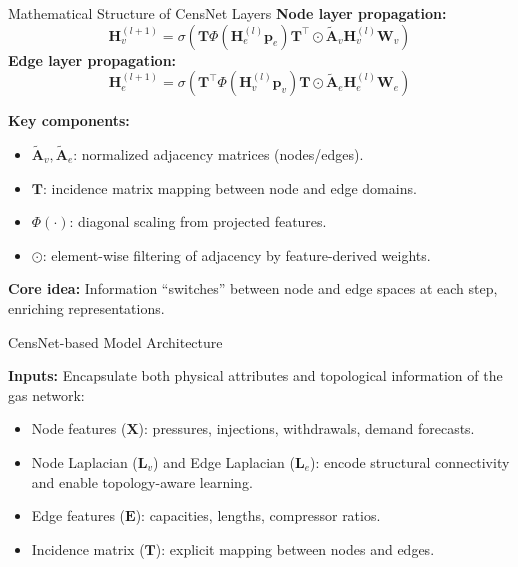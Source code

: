 \documentclass[hyperref={colorlinks,citecolor=blue,linkcolor=blue,urlcolor=blue}]{beamer}
\begin{document}
\begin{frame}{Mathematical Structure of CensNet Layers}
\footnotesize
\textbf{Node layer propagation:}
\[
\mathbf{H}^{(l+1)}_v = \sigma\left(
\mathbf{T} \Phi(\mathbf{H}^{(l)}_e \mathbf{p}_e) \mathbf{T}^\top 
\odot \tilde{\mathbf{A}}_v \mathbf{H}^{(l)}_v \mathbf{W}_v
\right)
\]
\textbf{Edge layer propagation:}
\[
\mathbf{H}^{(l+1)}_e = \sigma\left(
\mathbf{T}^\top \Phi(\mathbf{H}^{(l)}_v \mathbf{p}_v) \mathbf{T} 
\odot \tilde{\mathbf{A}}_e \mathbf{H}^{(l)}_e \mathbf{W}_e
\right)
\]

\medskip
\textbf{Key components:}
\begin{itemize}
    \item \( \tilde{\mathbf{A}}_v, \tilde{\mathbf{A}}_e \): normalized adjacency matrices (nodes/edges).
    \item \( \mathbf{T} \): incidence matrix mapping between node and edge domains.
    \item \( \Phi(\cdot) \): diagonal scaling from projected features.
    \item \( \odot \): element-wise filtering of adjacency by feature-derived weights.
\end{itemize}

\medskip
\textbf{Core idea:} Information “switches” between node and edge spaces at each step, enriching representations.
\end{frame}

\begin{frame}{CensNet-based Model Architecture}
\footnotesize
\justifying
    \centering
    \resizebox{0.9\textwidth}{!}{%
    } 

\textbf{Inputs:} Encapsulate both physical attributes and topological information of the gas network:
        \begin{itemize}
            \item Node features ($\mathbf{X}$): pressures, injections, withdrawals, demand forecasts.
            \item Node Laplacian ($\mathbf{L}_v$) and Edge Laplacian ($\mathbf{L}_e$): encode structural connectivity and enable topology-aware learning.
            \item Edge features ($\mathbf{E}$): capacities, lengths, compressor ratios.
            \item Incidence matrix ($\mathbf{T}$): explicit mapping between nodes and edges.
        \end{itemize} 
\end{frame}
\end{document}
